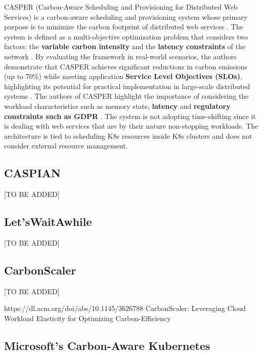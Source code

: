 CASPER (Carbon-Aware Scheduling and Provisioning for Distributed Web Services) is a carbon-aware scheduling and provisioning system whose primary purpose is to minimize the carbon footprint of distributed web services \cite{Souza_2023}.
The system is defined as a multi-objective optimization problem that considers two factors: the \textbf{variable carbon intensity} and the \textbf{latency constraints} of the network \cite{Souza_2023}.
By evaluating the framework in real-world scenarios, the authors demonstrate that CASPER achieves significant reductions in carbon emissions (up to 70\%) while meeting application \textbf{Service Level Objectives (SLOs)}, highlighting its potential for practical implementation in large-scale distributed systems \cite{Souza_2023}.
The authors of CASPER highlight the importance of considering the workload characteristics such as memory state, \textbf{latency} and \textbf{regulatory constraints such as GDPR} \cite{Souza_2023}.
The system is not adopting time-shifting since it is dealing with web services that are by their nature non-stopping workloads. The architecture is tied to scheduling K8s resources inside K8s clusters and does not consider external resource management.

\subsection{CASPIAN}

[TO BE ADDED]

\subsection{Let'sWaitAwhile}

[TO BE ADDED]

\subsection{CarbonScaler}

[TO BE ADDED]

https://dl.acm.org/doi/abs/10.1145/3626788
CarbonScaler: Leveraging Cloud Workload Elasticity for Optimizing Carbon-Efficiency

\subsection{Microsoft's Carbon-Aware Kubernetes}

